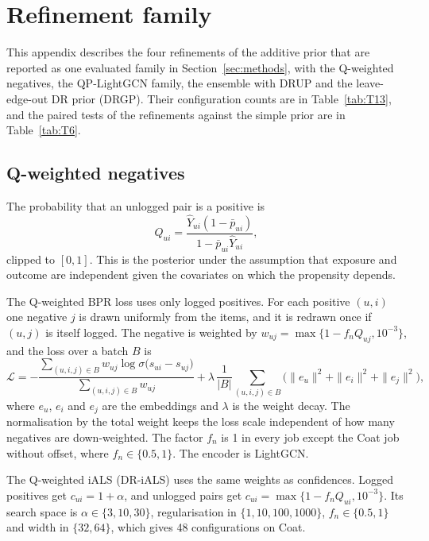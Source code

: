 \section{Refinement family}\label{app:refine}

This appendix describes the four refinements of the additive prior that are reported as one evaluated family in Section~\ref{sec:methods}, with the Q-weighted negatives, the QP-LightGCN family, the ensemble with DRUP and the leave-edge-out DR prior (DRGP). Their configuration counts are in Table~\ref{tab:T13}, and the paired tests of the refinements against the simple prior are in Table~\ref{tab:T6}.



\subsection{Q-weighted negatives}\label{sec:qweight}

The probability that an unlogged pair is a positive is
\begin{equation}\label{eq:Q}
Q_{ui}=\frac{\hat Y_{ui}(1-\bar p_{ui})}{1-\bar p_{ui}\hat Y_{ui}},
\end{equation}
clipped to $[0,1]$. This is the posterior under the assumption that exposure and outcome are independent given
the covariates on which the propensity depends.

The Q-weighted BPR loss uses only logged positives. For each positive $(u,i)$ one negative $j$ is drawn uniformly
from the items, and it is redrawn once if $(u,j)$ is itself logged. The negative is weighted by
$w_{uj}=\max\{1-f_nQ_{uj},10^{-3}\}$, and the loss over a batch $B$ is
\begin{equation*}
\mathcal L=-\frac{\sum_{(u,i,j)\in B}w_{uj}\log\sigma\bigl(s_{ui}-s_{uj}\bigr)}{\sum_{(u,i,j)\in B}w_{uj}}
+\lambda\,\frac{1}{|B|}\sum_{(u,i,j)\in B}\bigl(\|e_u\|^2+\|e_i\|^2+\|e_j\|^2\bigr),
\end{equation*}
where $e_u$, $e_i$ and $e_j$ are the embeddings and $\lambda$ is the weight decay. The normalisation by the total
weight keeps the loss scale independent of how many negatives are down-weighted. The factor $f_n$ is 1 in every
job except the Coat job without offset, where $f_n\in\{0.5,1\}$. The encoder is LightGCN.

The Q-weighted iALS (DR-iALS) uses the same weights as confidences. Logged positives get $c_{ui}=1+\alpha$, and
unlogged pairs get $c_{ui}=\max\{1-f_nQ_{ui},10^{-3}\}$. Its search space is $\alpha\in\{3,10,30\}$, regularisation in
$\{1,10,100,1000\}$, $f_n\in\{0.5,1\}$ and width in $\{32,64\}$, which gives 48 configurations on Coat.

